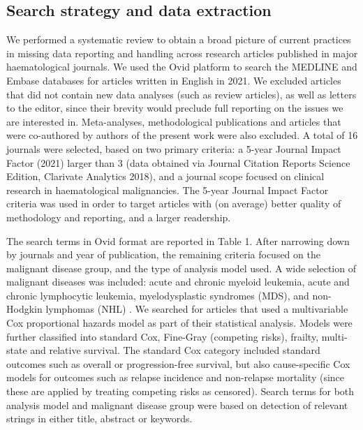 \documentclass[
  letterpaper,
  DIV=11,
  numbers=noendperiod]{scrreprt}
\begin{document}
\hypertarget{search-strategy-and-data-extraction}{%
\subsection{Search strategy and data
extraction}\label{search-strategy-and-data-extraction}}

We performed a systematic review to obtain a broad picture of current
practices in missing data reporting and handling across research
articles published in major haematological journals. We used the Ovid
platform to search the MEDLINE and Embase databases for articles written
in English in 2021. We excluded articles that did not contain new data
analyses (such as review articles), as well as letters to the editor,
since their brevity would preclude full reporting on the issues we are
interested in. Meta-analyses, methodological publications and articles
that were co-authored by authors of the present work were also excluded.
A total of 16 journals were selected, based on two primary criteria: a
5-year Journal Impact Factor (2021) larger than 3 (data obtained via
Journal Citation Reports Science Edition, Clarivate Analytics 2018), and
a journal scope focused on clinical research in haematological
malignancies. The 5-year Journal Impact Factor criteria was used in
order to target articles with (on average) better quality of methodology
and reporting, and a larger readership.

The search terms in Ovid format are reported in Table 1. After narrowing
down by journals and year of publication, the remaining criteria focused
on the malignant disease group, and the type of analysis model used. A
wide selection of malignant diseases was included: acute and chronic
myeloid leukemia, acute and chronic lymphocytic leukemia,
myelodysplastic syndromes (MDS), and non-Hodgkin lymphomas (NHL) . We
searched for articles that used a multivariable Cox proportional hazards
model as part of their statistical analysis. Models were further
classified into standard Cox, Fine-Gray (competing risks), frailty,
multi-state and relative survival. The standard Cox category included
standard outcomes such as overall or progression-free survival, but also
cause-specific Cox models for outcomes such as relapse incidence and
non-relapse mortality (since these are applied by treating competing
risks as censored). Search terms for both analysis model and malignant
disease group were based on detection of relevant strings in either
title, abstract or keywords.
\end{document}
